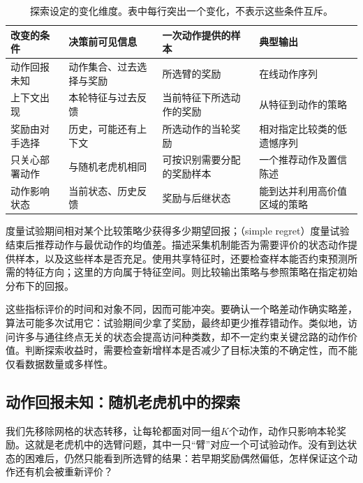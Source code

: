 \begin{table}[t]
  \centering
  \small
  \begin{tabularx}{\linewidth}{>{\raggedright\arraybackslash}p{25mm} >{\raggedright\arraybackslash}X >{\raggedright\arraybackslash}X >{\raggedright\arraybackslash}X}
    \toprule
    改变的条件 & 决策前可见信息 & 一次动作提供的样本 & 典型输出 \\
    \midrule
    动作回报未知 & 动作集合、过去选择与奖励 & 所选臂的奖励 & 在线动作序列 \\
    上下文出现 & 本轮特征与过去反馈 & 当前特征下所选动作的奖励 & 从特征到动作的策略 \\
    奖励由对手选择 & 历史，可能还有上下文 & 所选动作的当轮奖励 & 相对指定比较类的低遗憾序列 \\
    只关心部署动作 & 与随机老虎机相同 & 可按识别需要分配的奖励样本 & 一个推荐动作及置信陈述 \\
    动作影响状态 & 当前状态、历史反馈 & 奖励与后继状态 & 能到达并利用高价值区域的策略 \\
    \bottomrule
  \end{tabularx}
  \caption{探索设定的变化维度。表中每行突出一个变化，不表示这些条件互斥。}
  \label{tab:rl-learning-exploration-settings}
\end{table}

\begin{definition}[探索的几种评价对象]
  \label{def:rl-learning-exploration-objects}
  度量试验期间相对某个比较策略少获得多少期望回报；（simple regret）度量试验结束后推荐动作与最优动作的均值差。描述采集机制能否为需要评价的状态动作提供样本，以及这些样本是否充足。使用共享特征时，还要检查样本能否约束预测所需的特征方向；这里的方向属于特征空间。则比较输出策略与参照策略在指定初始分布下的回报。
\end{definition}

这些指标评价的时间和对象不同，因而可能冲突。要确认一个略差动作确实略差，算法可能多次试用它：试验期间少拿了奖励，最终却更少推荐错动作。类似地，访问许多与通往终点无关的状态会提高访问种类数，却不一定约束关键岔路的动作价值。判断探索收益时，需要检查新增样本是否减少了目标决策的不确定性，而不能仅看数据数量或多样性。

\subsection{动作回报未知：随机老虎机中的探索}
\label{sec:rl-learning-bandits}

我们先移除网格的状态转移，让每轮都面对同一组$K$个动作，动作只影响本轮奖励。这就是老虎机中的选臂问题，其中一只“臂”对应一个可试验动作。没有到达状态的困难后，仍然只能看到所选臂的结果：若早期奖励偶然偏低，怎样保证这个动作还有机会被重新评价？

